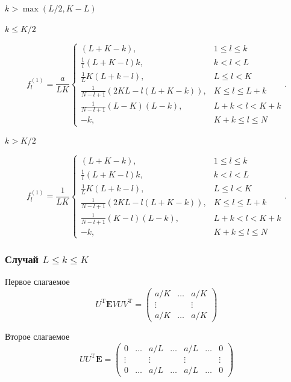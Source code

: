 \documentclass[specialist,
               substylefile = spbu.rtx,
               subf,href,colorlinks=true, 12pt]{disser}
\begin{document}
$k > \max(L / 2, K - L)$

$k \leq K/2$

$$f^{(1)}_l = \frac{a}{{LK}}
\begin{cases}
	(L + K - k), & \text{$1 \leq l \leq k$}\\
	\frac{1}{l}(L + K - l)k, & \text{$k < l < L$}\\
	\frac{1}{L}K(L + k - l), &\text{$L \leq l < K$}\\
	\frac{1}{N - l + 1}(2KL - l(L + K - k)), &\text{$K \leq l \leq L + k$}\\
	\frac{1}{N - l + 1}(L - K)(L - k), &\text{$L + k < l < K + k$}\\
	-k, &\text{$K + k \leq l \leq N$}
\end{cases}.
$$

$k > K/2$


$$f^{(1)}_l = \frac{1}{{LK}}
\begin{cases}
	(L + K - k), & \text{$1 \leq l \leq k$}\\
	\frac{1}{l}(L + K - l)k, & \text{$k < l < L$}\\
	\frac{1}{L}K(L + k - l), &\text{$L \leq l < K$}\\
	\frac{1}{N - l + 1}(2KL - l(L + K - k)), &\text{$K \leq l \leq L + k$}\\
	\frac{1}{N - l + 1}(K - l)(L - k), &\text{$L + k < l < K + k$}\\
	-k, &\text{$K + k \leq l \leq N $}
\end{cases}.
$$

\subsubsection{Случай $L \leq k \leq K$}

Первое слагаемое
$$U^{\mathrm{T}} \mathbf{E} V U V^{\mathrm{T}} = \begin{pmatrix}
	a/ K & \ldots &   a/ K\\
	\vdots & & \vdots\\
	a/ K &   \ldots &   a/ K
\end{pmatrix}$$

Второе слагаемое
$$U U^{\mathrm{T}} \mathbf{E} = \begin{pmatrix}
	0 & \ldots & a/L & \ldots & a/L & \ldots & 0\\
	\vdots & & \vdots & & \vdots & & \vdots\\
	0 & \ldots & a/L & \ldots & a/L & \ldots & 0
\end{pmatrix}$$
\end{document}
